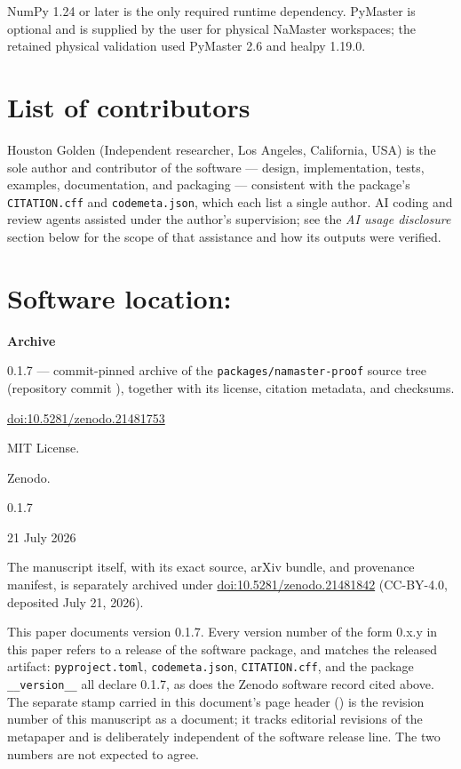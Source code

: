 NumPy 1.24 or later is the only required runtime dependency. PyMaster
is optional and is supplied by the user for physical NaMaster workspaces;
the retained physical validation used PyMaster 2.6 and healpy 1.19.0.

\section*{List of contributors}

Houston Golden (Independent researcher, Los Angeles, California, USA) is the
sole author and contributor of the software --- design, implementation, tests,
examples, documentation, and packaging --- consistent with the package's
\texttt{CITATION.cff} and \texttt{codemeta.json}, which each list a single
author. AI coding and review agents assisted under the author's supervision;
see the \emph{AI usage disclosure} section below for the scope of that
assistance and how its outputs were verified.

\section*{Software location:}

{\bf Archive}

\begin{description}[noitemsep,topsep=0pt]
	\item[Name:] \software{} 0.1.7 --- commit-pinned archive of the
	  \nolinkurl{packages/namaster-proof} source tree (repository commit
	  \texttt{}), together
	  with its license, citation metadata, and checksums.
	\item[Persistent identifier:]
	  \href{https://doi.org/10.5281/zenodo.21481753}{doi:10.5281/zenodo.21481753}
	\item[Licence:] MIT License.
	\item[Publisher:] Zenodo.
	\item[Version published:] 0.1.7
	\item[Date published:] 21 July 2026
\end{description}

The manuscript itself, with its exact source, arXiv bundle, and provenance
manifest, is separately archived under
\href{https://doi.org/10.5281/zenodo.21481842}{doi:10.5281/zenodo.21481842}
(CC-BY-4.0, deposited July 21, 2026).

This paper documents \software{} version 0.1.7. Every version number of the
form 0.x.y in this paper refers to a release of the \software{} software
package, and matches the released artifact: \texttt{pyproject.toml},
\texttt{codemeta.json}, \texttt{CITATION.cff}, and the package
\texttt{\_\_version\_\_} all declare 0.1.7, as does the Zenodo software record
cited above. The separate stamp carried in this document's page header
(\paperVersion) is the revision number of this manuscript as a document; it
tracks editorial revisions of the metapaper and is deliberately independent of
the software release line. The two numbers are not expected to agree.

